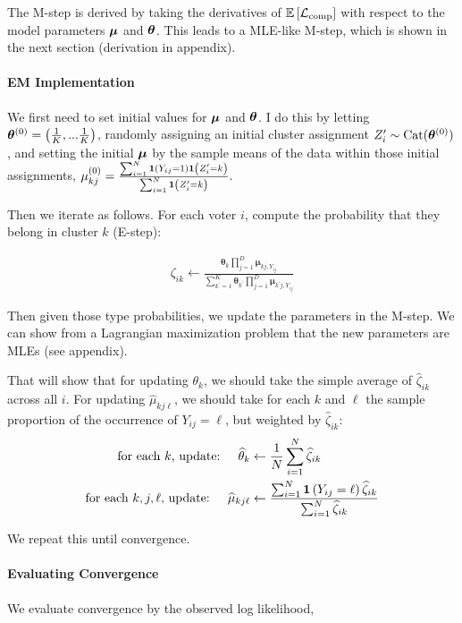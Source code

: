\documentclass[11pt]{article}
\begin{document}
The M-step is derived by taking the derivatives of \(\mathbb{E}\left[\mathcal{L}_{\text{comp}}\right]\) with respect to the model parameters \(\bm{\mu}\) and \(\bm{\theta}\). This leads to a MLE-like M-step, which is shown in the next section (derivation in appendix).


\paragraph{EM Implementation} We first need to set initial values for \(\bm{\mu}\) and \(\bm{\theta}\). I do this by letting \(\bm{\theta}^{(0)} = \left(\frac{1}{K},...\frac{1}{K}\right)\), randomly assigning an initial cluster assignment \(Z_i^\prime \sim \text{Cat}(\bm{\theta}^{(0)})\), and setting the initial \(\bm{\mu}\) by the sample means of the data within those initial assignments, \(\mu_{kj}^{(0)} = \frac{\sum_{i=1}^{N}\bm{1}\left(Y_{ij} = 1\right)\bm{1}\left(Z_{i}^{\prime} = k\right)}{\sum_{i=1}^{N}\bm{1}\left(Z_{i}^{\prime} = k\right)}.\) 

Then we iterate as follows. For each voter \(i\), compute the probability that they belong in cluster \(k\) (E-step):

\begin{align}
\zeta_{ik} \leftarrow \frac{\bm{\theta}_{k}\prod^{D}_{j=1}\bm{\mu}_{kj,Y_{ij}}}
{\sum^{K}_{k^\prime=1}\bm{\theta}_{k^\prime}\prod^{D}_{j=1}\bm{\mu}_{k^\prime j,Y_{ij}}}
\end{align}

Then given those type probabilities, we update the parameters in the M-step. We can show from a Lagrangian maximization problem that the new parameters are MLEs (see appendix). 

That will show that for updating \(\theta_k\), we should take the simple average of \(\widehat\zeta_{ik}\) across all \(i\). For updating \(\widehat\mu_{kj\ell}\), we should take for each \(k\) and \(\ell\) the sample proportion of the occurrence of \(Y_{ij} = \ell\), but weighted by \(\widehat\zeta_{ik}\):
\begin{align}
\text{for each \(k\), update: }~~~  \widehat{\theta}_{k} &\leftarrow \frac{1}{N}\sum^N_{i = 1}\widehat{\zeta}_{ik} \\
\text{for each \(k, j, \ell\), update: }~~~ \widehat{\mu}_{kj\ell} &\leftarrow\frac{\sum^N_{i=1}\bm{1}\left(Y_{ij} = \ell\right)\widehat{\zeta}_{ik}}{\sum^{N}_{i=1}\widehat{\zeta}_{ik}}
\end{align}


We repeat this until convergence. 

\paragraph{Evaluating Convergence} We evaluate convergence by the observed log likelihood, 
\end{document}
